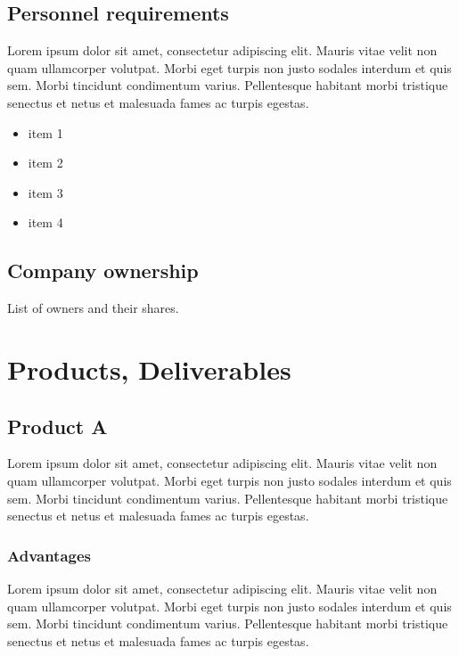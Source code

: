 \documentclass[11pt,a4paper,titlepage]{article}
\begin{document}
\subsection{Personnel requirements}
Lorem ipsum dolor sit amet, consectetur adipiscing elit. Mauris vitae velit 
non quam ullamcorper volutpat. Morbi eget turpis non justo sodales interdum 
et quis sem. Morbi tincidunt condimentum varius. Pellentesque habitant morbi 
tristique senectus et netus et malesuada fames ac turpis egestas.\newline
\begin{itemize}
\item item 1
\item item 2
\item item 3
\item item 4
\end{itemize}

\subsection{Company ownership}
List of owners and their shares.
\pagebreak

\section{Products, Deliverables}
\subsection{Product A}
Lorem ipsum dolor sit amet, consectetur adipiscing elit. Mauris vitae velit 
non quam ullamcorper volutpat. Morbi eget turpis non justo sodales interdum 
et quis sem. Morbi tincidunt condimentum varius. Pellentesque habitant morbi 
tristique senectus et netus et malesuada fames ac turpis egestas.\newline

\subsubsection{Advantages}
Lorem ipsum dolor sit amet, consectetur adipiscing elit. Mauris vitae velit 
non quam ullamcorper volutpat. Morbi eget turpis non justo sodales interdum 
et quis sem. Morbi tincidunt condimentum varius. Pellentesque habitant morbi 
tristique senectus et netus et malesuada fames ac turpis egestas.\newline
\end{document}
